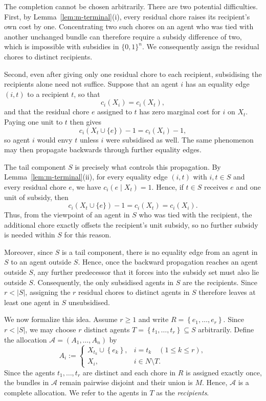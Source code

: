 \documentclass[sigconf,anonymous]{aamas}
\newcommand{\agents}{N}
\newcommand{\items}{M}
\newcommand{\alloc}{\mathcal{A}}
\newcommand{\set}[1]{\left\{#1\right\}}
\newcommand{\abs}[1]{\left\lvert#1\right\rvert}
\theoremstyle{acmplain}
\theoremstyle{acmdefinition}
\theoremstyle{acmplain}
\begin{document}
The completion cannot be chosen arbitrarily. There are two potential difficulties. First, by Lemma~\ref{lem:m-terminal}(i), every residual chore raises its recipient's own cost by one. Concentrating two such chores on an agent who was tied with another unchanged bundle can therefore require a subsidy difference of two, which is impossible with subsidies in $\{0,1\}^n$. We consequently assign the residual chores to distinct recipients.

Second, even after giving only one residual chore to each recipient, subsidising the recipients alone need not suffice. Suppose that an agent $i$ has an equality edge $(i,t)$ to a recipient $t$, so that
\[
c_i(X_i)=c_i(X_t),
\]
and that the residual chore $e$ assigned to $t$ has zero marginal cost for $i$ on $X_t$. Paying one unit to $t$ then gives
\[
c_i(X_t\cup\{e\})-1
   =c_i(X_i)-1,
\]
so agent $i$ would envy $t$ unless $i$ were subsidised as well. The same phenomenon may then propagate backwards through further equality edges.

The tail component $S$ is precisely what controls this propagation. By Lemma~\ref{lem:m-terminal}(ii), for every equality edge $(i,t)$ with $i,t\in S$ and every residual chore $e$, we have $c_i(e\mid X_t)=1$. Hence, if $t\in S$ receives $e$ and one unit of subsidy, then
\[
c_i(X_t\cup\{e\})-1
   =c_i(X_t)
   =c_i(X_i).
\]
Thus, from the viewpoint of an agent in $S$ who was tied with the recipient, the additional chore exactly offsets the recipient's unit subsidy, so no further subsidy is needed within $S$ for this reason.

Moreover, since $S$ is a tail component, there is no equality edge from an agent in $S$ to an agent outside $S$. Hence, once the backward propagation reaches an agent outside $S$, any further predecessor that it forces into the subsidy set must also lie outside $S$. Consequently, the only subsidised agents in $S$ are the recipients. Since $r<|S|$, assigning the $r$ residual chores to distinct agents in $S$ therefore leaves at least one agent in $S$ unsubsidised.

We now formalize this idea. Assume $r\geq 1$ and write
\(
    R=\set{e_1,\dots,e_r}.
\) Since $r<\abs S$, we may choose $r$ distinct agents \( T=\set{t_1,\dots,t_r}\subseteq S \) arbitrarily. Define the allocation $\alloc=(A_1,\dots,A_n)$ by
\begin{equation}
\label{eq:m-alloc}
  A_i :=
  \begin{cases}
    X_{t_k}\cup\set{e_k}, & i=t_k \quad (1\leq k\leq r),\\[2pt]
    X_i, & i\in\agents\setminus T.
  \end{cases}
\end{equation}
Since the agents $t_1,\dots,t_r$ are distinct and each chore in $R$ is assigned exactly once, the bundles in $\alloc$ remain pairwise disjoint and their union is $\items$. Hence, $\alloc$ is a complete allocation. We refer to the agents in $T$ as the \emph{recipients}.
\end{document}
